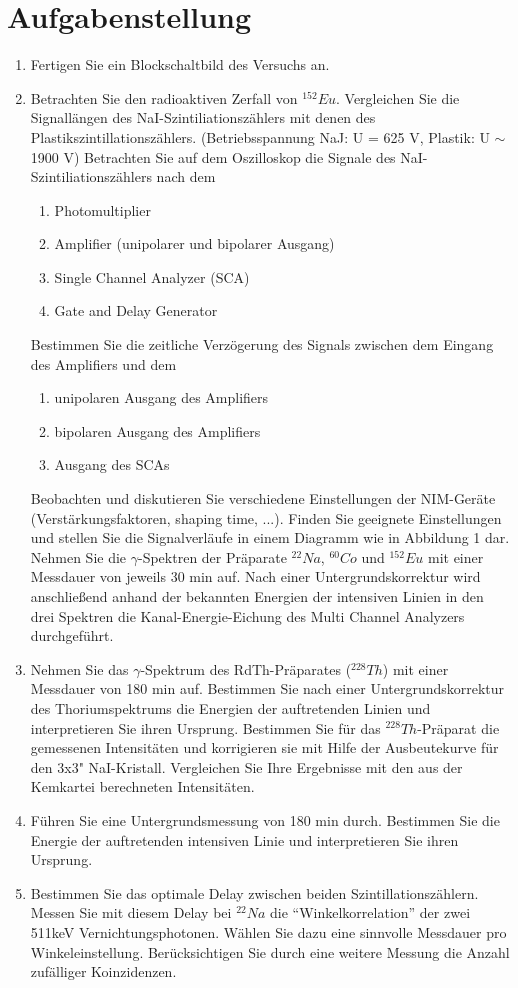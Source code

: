 \section{Aufgabenstellung}
\begin{enumerate}
 \item Fertigen Sie ein Blockschaltbild des Versuchs an.
 \item Betrachten Sie den radioaktiven Zerfall von $^{152}Eu$.
	Vergleichen Sie die Signallängen des NaI-Szintiliationszählers mit denen des Plastikszintillationszählers. (Betriebsspannung NaJ: U = 625 V, Plastik: U $\sim$ 1900 V)
	Betrachten Sie auf dem Oszilloskop die Signale des NaI-Szintiliationszählers nach dem
	\begin{enumerate}
	\item Photomultiplier
	\item Amplifier (unipolarer und bipolarer Ausgang)
	\item Single Channel Analyzer (SCA)
	\item Gate and Delay Generator
	\end{enumerate}
	Bestimmen Sie die zeitliche Verzögerung des Signals zwischen dem Eingang
	des Amplifiers und dem
	\begin{enumerate}
	 \item unipolaren Ausgang des Amplifiers
	 \item bipolaren Ausgang des Amplifiers
	 \item Ausgang des SCAs
	\end{enumerate}

	Beobachten und diskutieren Sie verschiedene Einstellungen der NIM-Geräte (Verstärkungsfaktoren, shaping time, ...). Finden Sie geeignete Einstellungen und stellen Sie die Signalverläufe in einem Diagramm wie in Abbildung 1 dar. Nehmen Sie die $\gamma$-Spektren der Präparate $^{22}Na$, $^{60}Co$ und $^{152}Eu$ mit einer Messdauer von jeweils 30 min auf. Nach einer Untergrundskorrektur wird anschließend anhand der bekannten Energien der intensiven Linien in den drei Spektren die Kanal-Energie-Eichung des Multi Channel Analyzers durchgeführt.
\item Nehmen Sie das $\gamma$-Spektrum des RdTh-Präparates ($^{228}Th$) mit einer Messdauer von 180 min auf.
Bestimmen Sie nach einer Untergrundskorrektur des Thoriumspektrums die Energien der auftretenden Linien und interpretieren Sie ihren
Ursprung. Bestimmen Sie für das $^{228}Th$-Präparat die gemessenen Intensitäten und korrigieren sie mit Hilfe der Ausbeutekurve für den 3x3" NaI-Kristall. Vergleichen Sie Ihre Ergebnisse mit den aus der Kemkartei berechneten Intensitäten.
\item Führen Sie eine Untergrundsmessung von 180 min durch. Bestimmen Sie die Energie der auftretenden intensiven Linie und interpretieren Sie ihren Ursprung.
\item Bestimmen Sie das optimale Delay zwischen beiden Szintillationszählern.
Messen Sie mit diesem Delay bei $^{22}Na$ die "`Winkelkorrelation"' der zwei 511keV Vernichtungsphotonen. Wählen Sie dazu eine sinnvolle Messdauer pro Winkel\-einstellung. Berücksichtigen Sie durch eine weitere Messung die Anzahl zufälliger Koinzidenzen.


\end{enumerate}
